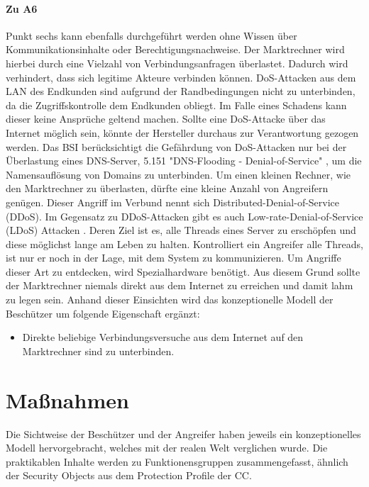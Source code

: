 \documentclass[11pt,a4paper]{report}
\begin{document}
\paragraph{Zu A6} Punkt sechs kann ebenfalls durchgeführt werden ohne Wissen über Kommunikationsinhalte oder Berechtigungsnachweise. Der Marktrechner wird hierbei durch eine Vielzahl von Verbindungsanfragen überlastet. Dadurch wird verhindert, dass sich legitime Akteure verbinden können. DoS-Attacken aus dem LAN des Endkunden sind aufgrund der Randbedingungen nicht zu unterbinden, da die Zugriffskontrolle dem Endkunden obliegt. Im Falle eines Schadens kann dieser keine Ansprüche geltend machen. Sollte eine DoS-Attacke über das Internet möglich sein, könnte der Hersteller durchaus zur Verantwortung gezogen werden. Das BSI berücksichtigt die Gefährdung von DoS-Attacken nur bei der Überlastung eines DNS-Server, 5.151 "DNS-Flooding - Denial-of-Service" \cite{bsi_g5151}, um die Namensauflösung von Domains zu unterbinden. Um einen kleinen Rechner, wie den Marktrechner zu überlasten, dürfte eine kleine Anzahl von Angreifern genügen. Dieser Angriff im Verbund nennt sich Distributed-Denial-of-Service (DDoS). Im Gegensatz zu DDoS-Attacken gibt es auch Low-rate-Denial-of-Service (LDoS) Attacken \cite[s.~303]{gutmann}. Deren Ziel ist es, alle Threads eines Server zu erschöpfen und diese möglichst lange am Leben zu halten. Kontrolliert ein Angreifer alle Threads, ist nur er noch in der Lage, mit dem System zu kommunizieren. Um Angriffe dieser Art zu entdecken, wird Spezialhardware benötigt. Aus diesem Grund sollte der Marktrechner niemals direkt aus dem Internet zu erreichen und damit lahm zu legen sein. Anhand dieser Einsichten wird das konzeptionelle Modell der Beschützer um folgende Eigenschaft ergänzt:

\begin{itemize}[leftmargin=*]
\item Direkte beliebige Verbindungsversuche aus dem Internet auf den Marktrechner sind zu unterbinden.
\end{itemize}

\section{Maßnahmen} \label{sec:analysis_measures}

Die Sichtweise der Beschützer und der Angreifer haben jeweils ein konzeptionelles Modell hervorgebracht, welches mit der realen Welt verglichen wurde. Die praktikablen Inhalte werden zu Funktionensgruppen zusammengefasst, ähnlich der Security Objects aus dem Protection Profile der CC.
\end{document}
